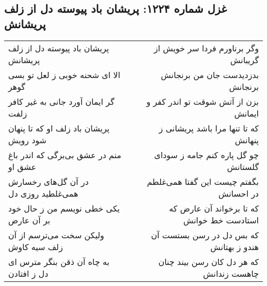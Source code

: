 \begin{center}
\section*{غزل شماره ۱۲۲۴: پریشان باد پیوسته دل از زلف پریشانش}
\label{sec:1224}
\begin{longtable}{l p{0.5cm} r}
پریشان باد پیوسته دل از زلف پریشانش
&&
وگر برناورم فردا سر خویش از گریبانش
\\
الا ای شحنه خوبی ز لعل تو بسی گوهر
&&
بدزدیدست جان من برنجانش برنجانش
\\
گر ایمان آورد جانی به غیر کافر زلفت
&&
بزن از آتش شوقت تو اندر کفر و ایمانش
\\
پریشان باد زلف او که تا پنهان شود رویش
&&
که تا تنها مرا باشد پریشانی ز پنهانش
\\
منم در عشق بی‌برگی که اندر باغ عشق او
&&
چو گل پاره کنم جامه ز سودای گلستانش
\\
در آن گل‌های رخسارش همی‌غلطید روزی دل
&&
بگفتم چیست این گفتا همی‌غلطم در احسانش
\\
یکی خطی نویسم من ز حال خود بر آن عارض
&&
که تا برخواند آن عارض که استادست خط خوانش
\\
ولیکن سخت می‌ترسم از آن زلف سیه کاوش
&&
که بس دل در رسن بستست آن هندو ز بهتانش
\\
به چاه آن ذقن بنگر مترس ای دل ز افتادن
&&
که هر دل کان رسن بیند چنان چاهست زندانش
\\
\end{longtable}
\end{center}
